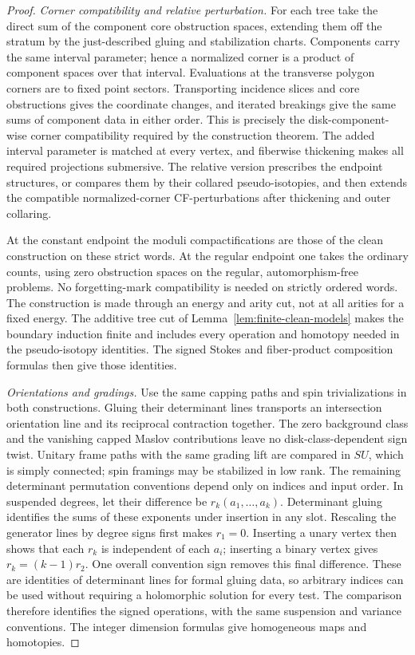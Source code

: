 \documentclass[11pt]{article}
\numberwithin{equation}{section}
\theoremstyle{definition}
\theoremstyle{remark}
\begin{document}
\begin{proof}
\emph{Corner compatibility and relative perturbation.}
For each tree take the direct sum of the component core obstruction
spaces, extending them off the stratum by the just-described
gluing and stabilization charts.  Components carry the same
interval parameter; hence a normalized corner is a product of
component spaces over that interval.  Evaluations at the
transverse polygon corners are to fixed point sectors.
Transporting incidence slices and core obstructions gives the
coordinate changes, and iterated breakings give the same sums
of component data in either order.  This is precisely the
disk-component-wise corner compatibility required by the
construction theorem.  The added interval parameter is matched
at every vertex, and fiberwise thickening makes all required
projections submersive.  The relative version prescribes the
endpoint structures, or compares them by their collared
pseudo-isotopies, and then extends the compatible normalized-corner
CF-perturbations after thickening and outer collaring.

At the constant endpoint the moduli compactifications are those
of the clean construction on these strict words.  At the regular
endpoint one takes the ordinary counts, using zero obstruction
spaces on the regular, automorphism-free problems.  No
forgetting-mark compatibility is needed on strictly ordered
words.  The construction is made through an energy and arity
cut, not at all arities for a fixed energy.  The additive tree
cut of Lemma~\ref{lem:finite-clean-models} makes the boundary
induction finite and includes every operation and homotopy
needed in the pseudo-isotopy identities.  The signed Stokes and
fiber-product composition formulas then give those identities.

\emph{Orientations and gradings.}
Use the same capping paths and spin trivializations in both
constructions.  Gluing their determinant lines transports an
intersection orientation line and its reciprocal contraction
together.  The zero background class and the vanishing capped
Maslov contributions leave no disk-class-dependent sign twist.
Unitary frame paths with the same grading lift are compared in
$SU$, which is simply connected; spin framings may be stabilized
in low rank.  The remaining determinant permutation conventions
depend only on indices and input order.  In suspended degrees,
let their difference be $r_k(a_1,\ldots,a_k)$.  Determinant
gluing identifies the sums of these exponents under insertion
in any slot.  Rescaling the generator lines by degree signs
first makes $r_1=0$.  Inserting a unary vertex then shows that
each $r_k$ is independent of each $a_i$; inserting a binary
vertex gives $r_k=(k-1)r_2$.  One overall convention sign removes
this final difference.  These are identities of determinant
lines for formal gluing data, so arbitrary indices can be used
without requiring a holomorphic solution for every test.
The comparison therefore identifies the signed operations,
with the same suspension and variance conventions.  The
integer dimension formulas give homogeneous maps and homotopies.


\end{proof}
\end{document}
